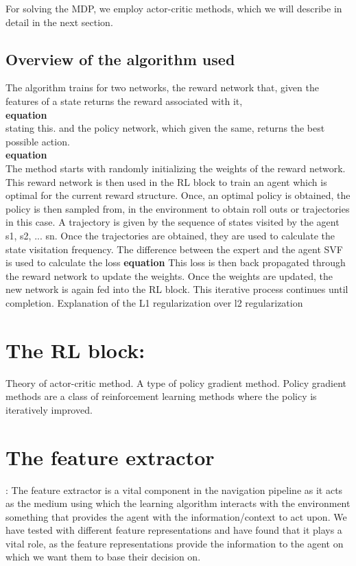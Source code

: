 For solving the MDP, we employ actor-critic methods, which we will describe in detail in the next section.
\subsection*{Overview of the algorithm used}
The algorithm trains for two networks, the reward network that, given the features of a state returns the reward associated with it,\\
\textbf{equation}\\ stating this.
and the policy network, which given the same, returns the best possible action.\\
\textbf{equation}\\
The method starts with randomly initializing the weights of the reward network. This reward network is then used in the  RL block to train an agent which is optimal for the current reward structure. Once, an optimal policy is obtained, the policy is then sampled from, in the environment to obtain roll outs or trajectories in this case. A trajectory is given by the sequence of states visited by the agent {s1, s2, ... sn}.
Once the trajectories are obtained, they are used to calculate the state visitation frequency. The difference between the expert and the agent SVF is used to calculate the loss
\textbf{equation}
This loss is then back propagated through the reward network to update the weights.
Once the weights are updated, the new network is again fed into the RL block. This iterative process continues until completion.
Explanation of the L1 regularization over l2 regularization 

\section*{The RL block:}
Theory of actor-critic method. A type of policy gradient method. Policy gradient methods are a class of reinforcement learning methods where the policy is iteratively improved.


\section*{The feature extractor}:
The feature extractor is a vital component in the navigation pipeline as it acts as the medium using which the learning algorithm interacts with the environment something that provides the agent with the information/context to act upon. 
We have tested with different feature representations and have found that it plays a vital role, as the feature representations provide the information to the agent on which we want them to base their decision on.

